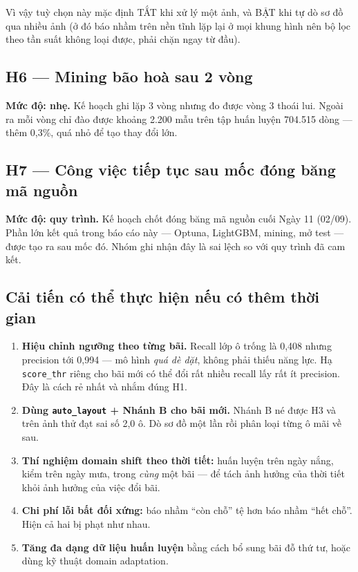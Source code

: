 \documentclass[12pt]{ai_conquer2026}
\begin{document}
Vì vậy tuỳ chọn này mặc định TẮT khi xử lý một ảnh, và BẬT khi tự dò sơ đồ qua nhiều ảnh (ở đó báo nhầm trên nền tĩnh lặp lại ở mọi khung hình nên bộ lọc theo tần suất không loại được, phải chặn ngay từ đầu).

\subsection{H6 --- Mining bão hoà sau 2 vòng}

\textbf{Mức độ: nhẹ.} Kế hoạch ghi lặp 3 vòng nhưng đo được vòng 3 thoái lui. Ngoài ra mỗi vòng chỉ đào được khoảng 2.200 mẫu trên tập huấn luyện 704.515 dòng --- thêm 0,3\%, quá nhỏ để tạo thay đổi lớn.

\subsection{H7 --- Công việc tiếp tục sau mốc đóng băng mã nguồn}

\textbf{Mức độ: quy trình.} Kế hoạch chốt đóng băng mã nguồn cuối Ngày 11 (02/09). Phần lớn kết quả trong báo cáo này --- Optuna, LightGBM, mining, mở test --- được tạo ra sau mốc đó. Nhóm ghi nhận đây là sai lệch so với quy trình đã cam kết.

\subsection{Cải tiến có thể thực hiện nếu có thêm thời gian}

\begin{enumerate}
\item \textbf{Hiệu chỉnh ngưỡng theo từng bãi.} Recall lớp ô trống là 0,408 nhưng precision tới 0,994 --- mô hình \textit{quá dè dặt}, không phải thiếu năng lực. Hạ \texttt{score\_thr} riêng cho bãi mới có thể đổi rất nhiều recall lấy rất ít precision. Đây là cách rẻ nhất và nhắm đúng H1.
\item \textbf{Dùng \texttt{auto\_layout} + Nhánh B cho bãi mới.} Nhánh B né được H3 và trên ảnh thử đạt sai số 2,0 ô. Dò sơ đồ một lần rồi phân loại từng ô mãi về sau.
\item \textbf{Thí nghiệm domain shift theo thời tiết:} huấn luyện trên ngày nắng, kiểm trên ngày mưa, trong \textit{cùng} một bãi --- để tách ảnh hưởng của thời tiết khỏi ảnh hưởng của việc đổi bãi.
\item \textbf{Chi phí lỗi bất đối xứng:} báo nhầm ``còn chỗ'' tệ hơn báo nhầm ``hết chỗ''. Hiện cả hai bị phạt như nhau.
\item \textbf{Tăng đa dạng dữ liệu huấn luyện} bằng cách bổ sung bãi đỗ thứ tư, hoặc dùng kỹ thuật domain adaptation.
\end{enumerate}
\end{document}
